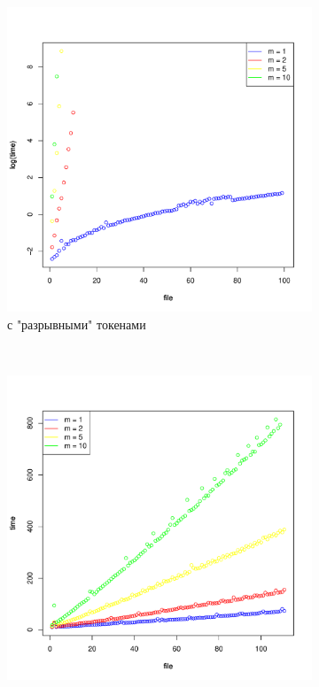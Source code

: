 \documentclass{matmex-diploma}
\begin{document}
\begin{figure}
        \centering
        \begin{subfigure}[b]{0.45\textwidth}
                \includegraphics[width=\textwidth]{YC_withBreak}
                \caption{с "разрывными" токенами}
                \label{fig:YC_withBreak}
        \end{subfigure}%
        ~ %
        \begin{subfigure}[b]{0.45\textwidth}
                \includegraphics[width=\textwidth]{YC_withoutBreak}

\end{subfigure}
\end{figure}
\end{document}
